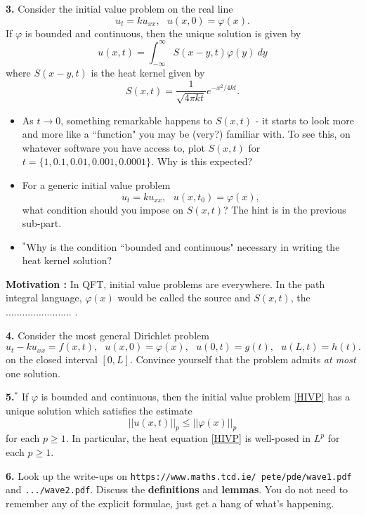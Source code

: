 \documentclass[aps,prl,groupedaddress,amsmath,amssymb,nofootinbib,11pt]{revtex4-1}
\begin{document}
\textbf{3.} Consider the initial value problem on the real line
\begin{equation}\label{HIVP}
u_t = ku_{xx}, ~~~ u(x,0) = \varphi(x).
\end{equation}
If $\varphi$ is bounded and continuous, then the unique solution is given by
\begin{equation}
u(x,t) = \int_{-\infty}^\infty S(x-y,t)\varphi(y)~dy
\end{equation}
where $S(x-y,t)$ is the heat kernel given by
\begin{equation}
S(x,t) =  \frac{1}{\sqrt{4\pi k t}}e^{-x^2/4kt}.
\end{equation}
\begin{itemize}
\item
As $t \to 0$, something remarkable happens to $S(x,t)$ -  it starts to look more and more like a ``function" you may be (very?) familiar with. To see this, on whatever software you have access to, plot $S(x,t)$ for $t = \{1, 0.1, 0.01, 0.001, 0.0001\}$. Why is this expected?
\item
For a generic initial value problem
\begin{equation}
u_t = ku_{xx}, ~~~ u(x,t_0) = \varphi(x),
\end{equation}
what condition should you impose on $S(x,t)$? The hint is in the previous sub-part.
\item
$^*$Why is the condition ``bounded and continuous" necessary in writing the heat kernel solution?
\end{itemize}
\textbf{Motivation :} In QFT, initial value problems are everywhere. In the path integral language, $\varphi(x)$ would be called the source and $S(x,t)$, the $........................$ .
\vspace{1 mm}

\textbf{4.} Consider the most general Dirichlet problem
\begin{equation}
u_t - k u_{xx} = f(x,t), ~~~ u(x,0) = \varphi(x), ~~~ u(0,t) = g(t), ~~~ u(L,t) = h(t).
\end{equation}
on the closed interval $[0,L]$. Convince yourself that the problem admits \emph{at most} one solution.

\textbf{5.$^*$} If $\varphi$ is bounded and continuous, then the initial value problem \eqref{HIVP} has a unique solution which satisfies the estimate
\begin{equation}
||u(x,t)||_p \leq ||\varphi(x)||_p
\end{equation}
for each $p \geq 1$. In particular, the heat equation \eqref{HIVP} is well-posed in $L^p$ for each $p \geq 1$.
\vspace{1 mm}

\textbf{6. } Look up the write-ups on \texttt{https://www.maths.tcd.ie/~pete/pde/wave1.pdf} and \texttt{.../wave2.pdf}. Discuss the \textbf{definitions} and \textbf{lemmas}. You do not need to remember any of the explicit formulae, just get a hang of what's happening.
\end{document}
